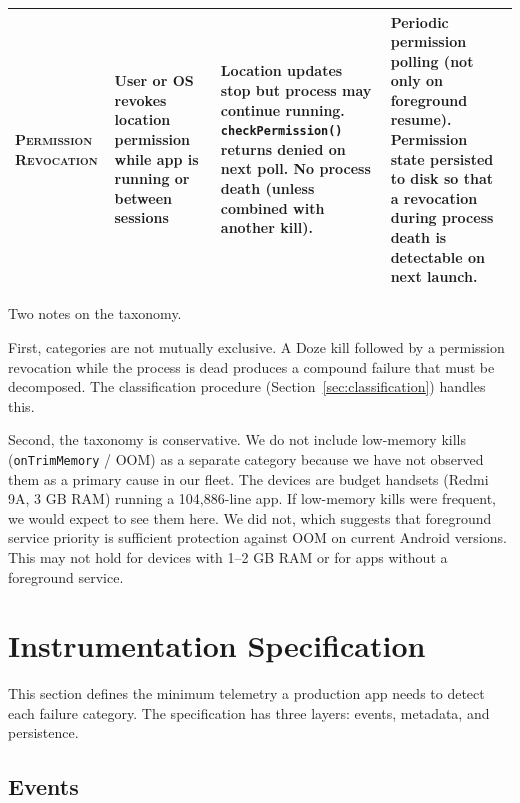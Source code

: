 \documentclass[10pt,journal,compsoc]{IEEEtran}
\begin{document}
\begin{table}[t]
\begin{tabular}{@{}p{2.4cm}p{3.2cm}p{4.8cm}p{4.8cm}@{}}
\textsc{Permission Revocation} &
User or OS revokes location permission while app is running or between sessions &
Location updates stop but process may continue running. \texttt{checkPermission()} returns denied on next poll. No process death (unless combined with another kill). &
Periodic permission polling (not only on foreground resume). Permission state persisted to disk so that a revocation during process death is detectable on next launch. \\

\bottomrule
\end{tabular}
\end{table}

Two notes on the taxonomy.

First, categories are not mutually exclusive. A Doze kill followed by
a permission revocation while the process is dead produces a compound
failure that must be decomposed. The classification procedure
(Section~\ref{sec:classification}) handles this.

Second, the taxonomy is conservative. We do not include low-memory kills
(\texttt{onTrimMemory} / OOM) as a separate category because we have not
observed them as a primary cause in our fleet. The devices are budget
handsets (Redmi 9A, 3 GB RAM) running a 104,886-line app. If
low-memory kills were frequent, we would expect to see them here. We
did not, which suggests that foreground service priority is sufficient
protection against OOM on current Android versions. This may not hold
for devices with 1--2 GB RAM or for apps without a foreground service.


\section{Instrumentation Specification}
\label{sec:instrumentation}

This section defines the minimum telemetry a production app needs to
detect each failure category. The specification has three layers:
events, metadata, and persistence.

\subsection{Events}
\label{sec:events}
\end{document}
